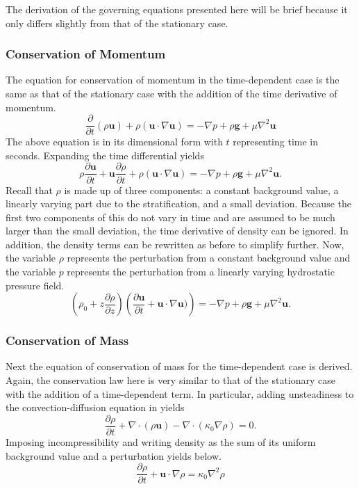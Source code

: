 \documentclass[12pt]{article}
\begin{document}
The derivation of the governing equations presented here will be brief because it only differs slightly from that of the stationary case.

\subsubsection{Conservation of Momentum}

The equation for conservation of momentum in the time-dependent case is the same as that of the stationary case  with the addition of the time derivative of momentum.
\begin{equation}
\frac{\partial}{\partial t}(\rho\mathbf{u})+\rho(\mathbf{u}\cdot\nabla\mathbf{u})=-\nabla p + \rho\mathbf{g}+\mu\nabla^2\mathbf{u}
\end{equation}
The above equation is in its dimensional form with $t$ representing time in seconds. Expanding the time differential yields
\begin{equation}
\rho\frac{\partial\mathbf{u}}{\partial t}+\mathbf{u}\frac{\partial\rho}{\partial t}+\rho(\mathbf{u}\cdot\nabla\mathbf{u})=-\nabla p + \rho\mathbf{g}+\mu\nabla^2\mathbf{u}.
\end{equation}
Recall that $\rho$ is made up of three components: a constant background value, a linearly varying part due to the stratification, and a small deviation. Because the first two components of this do not vary in time and are assumed to be much larger than the small deviation, the time derivative of density can be ignored. In addition, the density terms can be rewritten as before to simplify further. Now, the variable $\rho$ represents the perturbation from a constant background value and the variable $p$ represents the perturbation from a linearly varying hydrostatic pressure field.
\begin{equation}
\label{eq:unsteady_cons_momentum}
\left(\rho_0+z\frac{\partial\rho}{\partial z}\right)\left(\frac{\partial\mathbf{u}}{\partial t}+\mathbf{u}\cdot\nabla\mathbf{u})\right)=-\nabla p + \rho\mathbf{g}+\mu\nabla^2\mathbf{u}.
\end{equation}

\subsubsection{Conservation of Mass}
Next the equation of conservation of mass for the time-dependent case is derived. Again, the conservation law here is very similar to that of the stationary case with the addition of a time-dependent term. In particular, adding unsteadiness to the convection-diffusion equation in  yields
\begin{equation}
\frac{\partial \rho}{\partial t}+\nabla\cdot(\rho\mathbf{u})-\nabla\cdot(\kappa_0\nabla\rho)=0.
\end{equation}
Imposing incompressibility and writing density as the sum of its uniform background value and a perturbation yields  below.
\begin{equation}
\label{eq:unsteady_ad_diff}
\frac{\partial \rho}{\partial t}+\mathbf{u}\cdot\nabla\rho=\kappa_0\nabla^2\rho
\end{equation}
\end{document}
